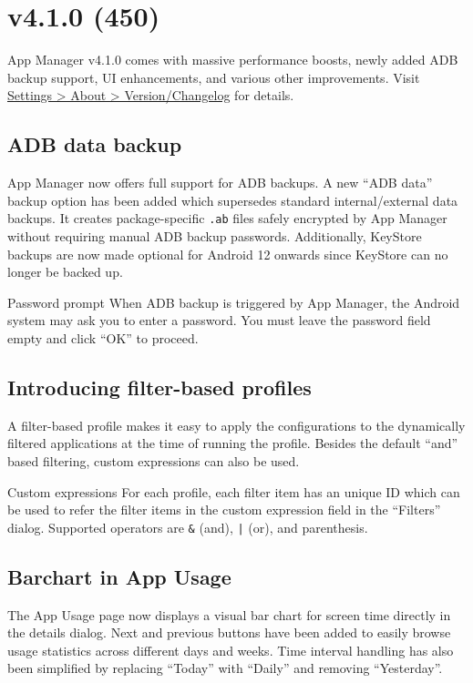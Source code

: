 \section{v4.1.0 (450)}\label{sec:v4.1.0-(450)}

App Manager v4.1.0 comes with massive performance boosts, newly added ADB backup support, UI
enhancements, and various other improvements. Visit \href{app-manager://settings/about/version}{Settings > About > Version/Changelog} for details.

\subsection{ADB data backup}
App Manager now offers full support for ADB backups. A new ``ADB data'' backup option has been added
which supersedes standard internal/external data backups. It creates package-specific \texttt{.ab}
files safely encrypted by App Manager without requiring manual ADB backup passwords. Additionally,
KeyStore backups are now made optional for Android 12 onwards since KeyStore can no longer be backed
up.

\begin{tip}{Password prompt}
When ADB backup is triggered by App Manager, the Android system may ask you to enter a password. You
must leave the password field empty and click ``OK'' to proceed.
\end{tip}

\subsection{Introducing filter-based profiles}
A filter-based profile makes it easy to apply the configurations to the dynamically filtered
applications at the time of running the profile. Besides the default ``and'' based filtering, custom
expressions can also be used.

\begin{tip}{Custom expressions}
For each profile, each filter item has an unique ID which can be used to refer the filter items in
the custom expression field in the ``Filters'' dialog. Supported operators are \texttt{\&} (and),
\texttt{|} (or), and parenthesis.
\end{tip}

\subsection{Barchart in App Usage}
The App Usage page now displays a visual bar chart for screen time directly in the details dialog.
Next and previous buttons have been added to easily browse usage statistics across different days
and weeks. Time interval handling has also been simplified by replacing ``Today'' with ``Daily''
and removing ``Yesterday''.

